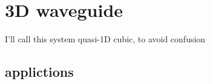 \section{3D waveguide}

I'll call this system quasi-1D cubic, to avoid confusion



\subsection{applictions}